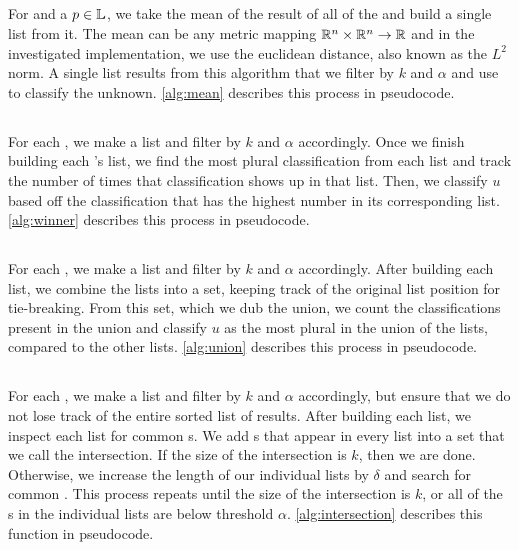 \subsection{\rmean{}}
For \UNKNOWN{} and a $p\in\mathbb{L}{}$, we take the mean of the result of all of the \compfuncs{} and build a single \knnlong{} list from it.
The mean can be any metric mapping $\mathbb{R}^n\times\mathbb{R}^n\rightarrow\mathbb{R}$ and in the investigated implementation, we use the euclidean distance, also known as the $L^2$ norm.
A single \knnlong{} list results from this algorithm that we filter by $k$ and $\alpha$ and use to classify the unknown.
\autoref{alg:mean} describes this process in pseudocode.


\subsection{\rwinner{}}
For each \compfunc{}, we make a \knnlong{} list and filter by $k$ and $\alpha$ accordingly.
Once we finish building each \compfunc{}'s \knnlong{} list, we find the most plural classification from each list and track the number of times that classification shows up in that list.
Then, we classify $u$ based off the classification that has the highest number in its corresponding list.
\autoref{alg:winner} describes this process in pseudocode.


\subsection{\runion{}}
For each \compfunc{}, we make a \knnlong{} list and filter by $k$ and $\alpha$ accordingly.
After building each \knnlong{} list, we combine the lists into a set, keeping track of the original list position for tie-breaking.
From this set, which we dub the union, we count the classifications present in the union and classify $u$ as the most plural in the union of the lists, compared to the other lists.
\autoref{alg:union} describes this process in pseudocode.


\subsection{\rintersect{}}
For each \compfunc{}, we make a \knnlong{} list and filter by $k$ and $\alpha$ accordingly, but ensure that we do not lose track of the entire sorted list of results.
After building each \knnlong{} list, we inspect each list for common \isol{}s.
We add \isol{}s that appear in every list into a set that we call the intersection.
If the size of the intersection is $k$, then we are done.
Otherwise, we increase the length of our individual lists by $\delta$ and search for common \isol{}.
This process repeats until the size of the intersection is $k$, or all of the \isol{}s in the individual lists are below threshold $\alpha$.
\autoref{alg:intersection} describes this function in pseudocode.
